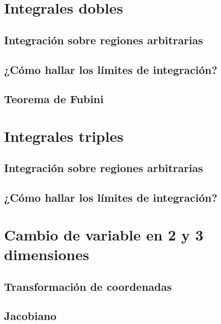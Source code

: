 \documentclass[12pt, fleqn]{report}                             %
\theoremstyle{break}                                            %
\begin{document}
        \section{Integrales dobles}
            
            \subsection{Integración sobre regiones arbitrarias}
            
            \subsection{¿Cómo hallar los límites de integración?}
            
            \subsection{Teorema de Fubini}
        
        \section{Integrales triples}
            
            \subsection{Integración sobre regiones arbitrarias}
            
            \subsection{¿Cómo hallar los límites de integración?}
            
        \section{Cambio de variable en 2 y 3 dimensiones}
        
            \subsection{Transformación de coordenadas}
            
            \subsection{Jacobiano}
            
\end{document}
